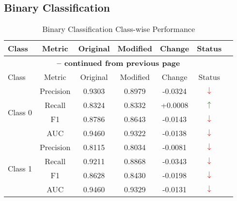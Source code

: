 \documentclass[12pt,a4paper]{article}
\begin{document}
\subsection{Binary Classification}
\begin{longtable}{lcccccc}
\caption{Binary Classification Class-wise Performance}
\label{tab:binary_class_metrics} \\
\toprule
Class & Metric & Original & Modified & Change & Status \\
\midrule
\endfirsthead
\multicolumn{6}{c}{{\bfseries \tablename\ \thetable{} -- continued from previous page}} \\
\toprule
Class & Metric & Original & Modified & Change & Status \\
\midrule
\endhead
\multirow{4}{*}{Class 0} & Precision & 0.9303 & 0.8979 & -0.0324 & \textcolor{red}{$\downarrow$} \\
 & Recall & 0.8324 & 0.8332 & +0.0008 & \textcolor{green}{$\uparrow$} \\
 & F1 & 0.8786 & 0.8643 & -0.0143 & \textcolor{red}{$\downarrow$} \\
 & AUC & 0.9460 & 0.9322 & -0.0138 & \textcolor{red}{$\downarrow$} \\
\midrule
\multirow{4}{*}{Class 1} & Precision & 0.8115 & 0.8034 & -0.0081 & \textcolor{red}{$\downarrow$} \\
 & Recall & 0.9211 & 0.8868 & -0.0343 & \textcolor{red}{$\downarrow$} \\
 & F1 & 0.8628 & 0.8430 & -0.0198 & \textcolor{red}{$\downarrow$} \\
 & AUC & 0.9460 & 0.9329 & -0.0131 & \textcolor{red}{$\downarrow$} \\
\bottomrule
\end{longtable}
\end{document}
